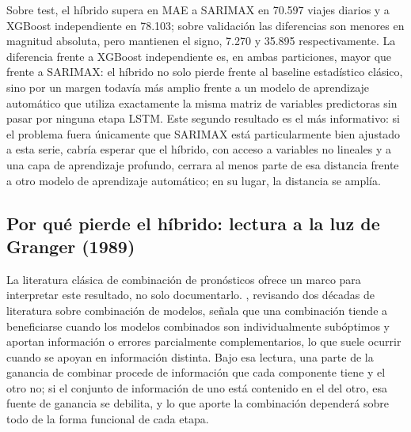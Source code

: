Sobre test, el híbrido supera en MAE a SARIMAX en 70.597 viajes diarios y a XGBoost
independiente en 78.103; sobre validación las diferencias son menores en magnitud
absoluta, pero mantienen el signo, 7.270 y 35.895 respectivamente. La diferencia frente a
XGBoost independiente es, en ambas particiones, mayor que frente a SARIMAX: el híbrido no
solo pierde frente al baseline estadístico clásico, sino por un margen todavía más amplio
frente a un modelo de aprendizaje automático que utiliza exactamente la misma matriz de
variables predictoras sin pasar por ninguna etapa LSTM. Este segundo resultado es el más
informativo: si el problema fuera únicamente que SARIMAX está particularmente bien
ajustado a esta serie, cabría esperar que el híbrido, con acceso a variables no lineales y
a una capa de aprendizaje profundo, cerrara al menos parte de esa distancia frente a otro
modelo de aprendizaje automático; en su lugar, la distancia se amplía.

\subsection{Por qué pierde el híbrido: lectura a la luz de Granger (1989)}\label{sec:resultado_negativo_teoria}

La literatura clásica de combinación de pronósticos ofrece un marco para interpretar
este resultado, no solo documentarlo. \textcite{granger1989combining}, revisando dos
décadas de literatura sobre combinación de modelos, señala que una combinación tiende a
beneficiarse cuando los modelos combinados son individualmente subóptimos y aportan
información o errores parcialmente complementarios, lo que suele ocurrir cuando se
apoyan en información distinta. Bajo esa lectura, una parte de la
ganancia de combinar procede de información que cada componente tiene y el otro no; si el
conjunto de información de uno está contenido en el del otro, esa fuente de ganancia se
debilita, y lo que aporte la combinación dependerá sobre todo de la forma funcional de
cada etapa.


